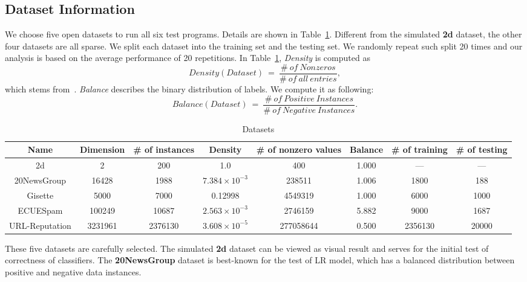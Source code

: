 \documentclass[10pt, conference, compsocconf]{IEEEtran}
\begin{document}
\subsection{Dataset Information}
We choose five open datasets to run all six test programs. Details are shown in Table~\ref{tab:table1}.	
Different from the simulated \textbf{2d} dataset, the other four datasets are all sparse.
We split each dataset into the training set and the testing set. We randomly repeat such split 20 times and our analysis is based on the average performance of 20 repetitions. In Table~\ref{tab:table1}, \textit{Density} is computed as
\[
Density(Dataset)~=~\frac{\#~of~Nonzeros}{\#~of~all~entries},
\]
which stems from~\cite{sarwar2001item}.
\textit{Balance} describes the binary distribution of labels.
We compute it as following:
\[
Balance(Dataset)~=~\frac{\#~of~Positive~Instances}{\#~of~Negative~Instances}.
\]
\begin{table}%
\centering
\caption{Datasets}\label{tab:table1}\vspace{-0.3cm}
\begin{tabular}{|c|c|c|c|c|c|c|c|}
\hline
    Name           & Dimension & \# of instances & Density  & \# of nonzero values & Balance & \# of training & \# of testing\\
\hline
    2d             & 2             & 200            & 1.0                      & 400          & 1.000 & --- & --- \\
\hline
    20NewsGroup    & 16428         & 1988           & $7.384\times10^{-3}$     & 238511          & 1.006 & 1800 & 188\\
\hline
    Gisette        & 5000          & 7000           & 0.12998                  & 4549319          & 1.000 & 6000 & 1000\\
\hline
    ECUESpam       & 100249        & 10687          & $2.563\times10^{-3}$     & 2746159          & 5.882 & 9000 & 1687\\
\hline
    URL-Reputation & 3231961       & 2376130        & $3.608\times10^{-5}$     & 277058644          & 0.500 & 2356130 & 20000\\
\hline
\end{tabular}\vspace{-0.3cm}
\end{table}
These five datasets are carefully selected.
The simulated \textbf{2d} dataset can be viewed as visual result and serves for the initial test of correctness of classifiers.
The \textbf{20NewsGroup} dataset is best-known for the test of LR model, which has a balanced distribution between positive and negative data instances.
\end{document}
